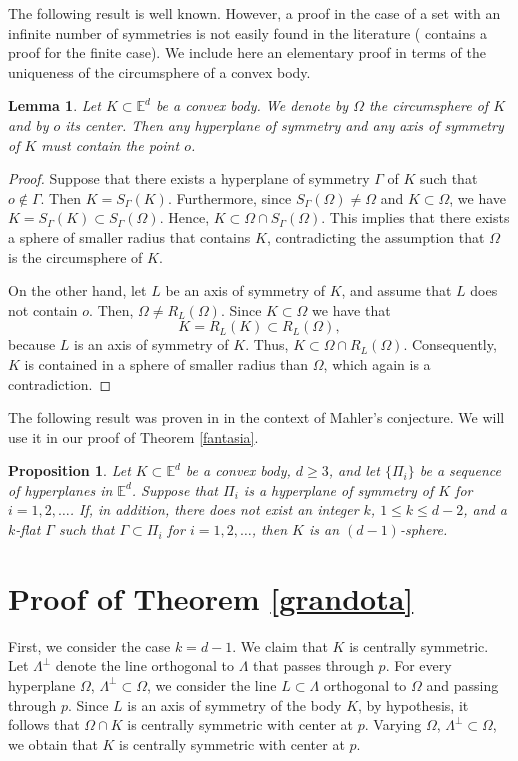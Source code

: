 \documentclass[12pt,thmsa]{amsart}
\newcommand{\Ed}{\mathbb{E}^{d}}
\newtheorem{proposition}{Proposition}
\newtheorem{lemma}{Lemma}
\begin{document}
The following result is well known. However, a proof in the case of a set with an infinite number of symmetries is not easily found in the literature (\cite[Sec.3.2 Thm 5]{conway}  contains a proof for the finite case). We include here an elementary proof in terms of the uniqueness of the circumsphere of a convex body. 


 \begin{lemma}\label{concurrentes}
Let $K\subset \Ed$ be a convex body. We denote by $\Omega$ the circumsphere of $K$ and by $o$ its center. Then any hyperplane of symmetry and any axis of symmetry of $K$ must contain the point $o$.
\end{lemma}
\begin{proof}
Suppose that there exists a hyperplane  of symmetry $\Gamma$ of $K$ such that $o\notin \Gamma$. Then $K=S_{\Gamma}(K)$. Furthermore, since $S_{\Gamma}(\Omega)\not= \Omega$ and $K\subset \Omega$, we have  $K=S_{\Gamma}(K)\subset S_{\Gamma}(\Omega)$. Hence, $K\subset \Omega \cap S_{\Gamma}(\Omega)$. This implies that there exists a sphere of smaller radius that contains $K$, contradicting the assumption that $\Omega$ is the circumsphere of $K$.

On the other hand, let $L$ be an axis of symmetry of $K$, and assume that $L$ does not contain $o$. Then, 
$\Omega\not=R_{L}(\Omega)$. Since $K\subset \Omega$ we have that 
\[
K=R_{L}(K)\subset R_{L}(\Omega),
\]
because $L$ is an axis of symmetry of $K$. Thus, $K\subset \Omega \cap R_{L}(\Omega)$. Consequently, $K$ is contained in a sphere of smaller radius than $\Omega$, which again is a contradiction. 
\end {proof}


The following result was proven in \cite{barthe} in the context of Mahler's conjecture. We will use it in our proof of Theorem \ref{fantasia}. 


\begin{proposition}\label{frances}Let $K\subset \Ed$ be a convex body, $d\geq 3$, and let $\{\Pi_i\}$ be a sequence of hyperplanes in $\Ed$. Suppose that $\Pi_i$ is a hyperplane of symmetry of $K$ for $i=1,2,\ldots$. If, in addition, there does not exist an integer $k$, $1\leq k \leq d-2$, and a $k$-flat $\Gamma$ such that $ \Gamma \subset  \Pi_i$ for $i=1,2,\ldots$, then $K$ is an $(d-1)$-sphere. 
\end{proposition} 



\section{Proof of Theorem \ref{grandota}}
First, we consider the case $k=d-1$. We claim that $K$ is centrally symmetric. Let  $\Lambda^{\perp}$ denote the line orthogonal to $ \Lambda$ that passes through $p$. For every  hyperplane $\Omega$, $  \Lambda^{\perp} \subset \Omega$, we consider the line $ L\subset   \Lambda$ orthogonal to $\Omega$ and passing through $p$. Since $L$ is an axis of symmetry of the body $K$, by hypothesis, it follows that $\Omega \cap K$ is centrally symmetric with center at $p$. Varying $\Omega$, $  \Lambda^{\perp} \subset \Omega$, we obtain that $K$ is centrally symmetric with center at $p$.   
\end{document}
